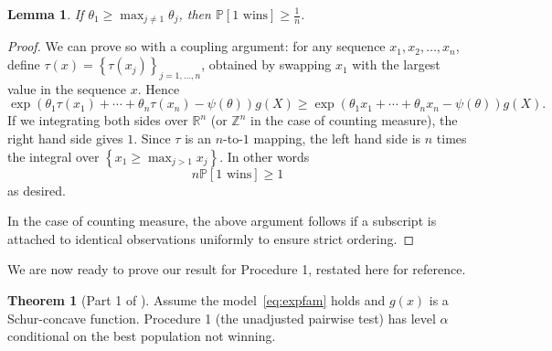 \documentclass[11pt]{article}
\newtheorem{lemma}[corollary]{Lemma}
\theoremstyle{definition}
\theoremstyle{custom}
\newtheorem*{customthm}{Theorem}
\newcommand{\PP}{\mathbb{P}}
\begin{document}
\begin{lemma}
If $\theta_1 \ge \max_{j \ne 1} \theta_j$, then $\PP\left[1 \text{ wins}\right] \ge \frac{1}{n}$.
\label{lma:margsharp}
\end{lemma}

\begin{proof}
We can prove so with a coupling argument: for any sequence $x_1, x_2, \ldots, x_n$, define $\tau\left(x\right) = \left\{\tau\left(x_j\right)\right\}_{j = 1, \ldots, n}$, obtained by swapping $x_1$ with the largest value in the sequence $x$. Hence
$$\exp\left(\theta_1 \tau\left(x_1\right) + \cdots + \theta_n \tau\left(x_n\right) - \psi\left(\theta\right)\right) g\left(X\right) \ge \exp\left(\theta_1 x_1 + \cdots + \theta_n x_n - \psi\left(\theta\right)\right) g\left(X\right).$$
If we integrating both sides over $\mathbb{R}^n$ (or $\mathbb{Z}^n$ in the case of counting measure), the right hand side gives $1$. Since $\tau$ is an $n$-to-$1$ mapping, the left hand side is $n$ times the integral over $\left\{x_1 \ge \max_{j > 1} x_j\right\}$. In other words
$$n \PP\left[1 \text{ wins}\right] \ge 1$$
as desired.

In the case of counting measure, the above argument follows if a subscript is attached to identical observations uniformly to ensure strict ordering.
\end{proof}

We are now ready to prove our result for Procedure 1, restated here for reference.

\begin{customthm}[Part 1 of ]
Assume the model~\eqref{eq:expfam} holds and $g\left(x\right)$ is a Schur-concave function. Procedure 1 (the unadjusted pairwise test) has level $\alpha$ conditional on the best population not winning.
\end{customthm}
\end{document}
